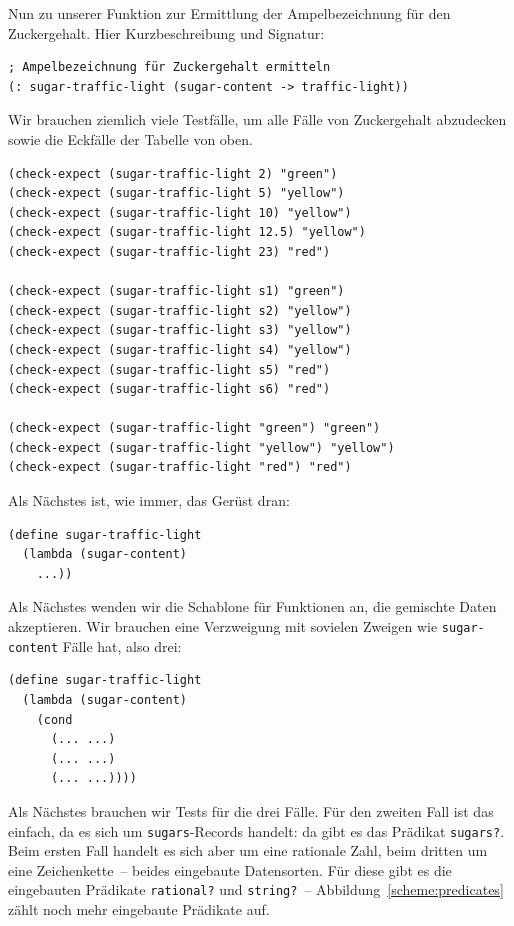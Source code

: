 Nun zu unserer Funktion zur Ermittlung der Ampelbezeichnung für den
Zuckergehalt.  Hier Kurzbeschreibung und Signatur:
%
\begin{lstlisting}
; Ampelbezeichnung für Zuckergehalt ermitteln
(: sugar-traffic-light (sugar-content -> traffic-light))
\end{lstlisting}
%
Wir brauchen ziemlich viele Testfälle, um alle Fälle von
Zuckergehalt abzudecken sowie die Eckfälle der Tabelle von oben.
%
\begin{lstlisting}
(check-expect (sugar-traffic-light 2) "green")
(check-expect (sugar-traffic-light 5) "yellow")
(check-expect (sugar-traffic-light 10) "yellow")
(check-expect (sugar-traffic-light 12.5) "yellow")
(check-expect (sugar-traffic-light 23) "red")

(check-expect (sugar-traffic-light s1) "green")
(check-expect (sugar-traffic-light s2) "yellow")
(check-expect (sugar-traffic-light s3) "yellow")
(check-expect (sugar-traffic-light s4) "yellow")
(check-expect (sugar-traffic-light s5) "red")
(check-expect (sugar-traffic-light s6) "red")

(check-expect (sugar-traffic-light "green") "green")
(check-expect (sugar-traffic-light "yellow") "yellow")
(check-expect (sugar-traffic-light "red") "red")
\end{lstlisting}
%
Als Nächstes ist, wie immer, das Gerüst dran:
%
\begin{lstlisting}
(define sugar-traffic-light
  (lambda (sugar-content)
    ...))
\end{lstlisting}         
%
Als Nächstes wenden wir die Schablone für Funktionen an, die gemischte
Daten akzeptieren.  Wir brauchen eine Verzweigung mit sovielen Zweigen
wie \lstinline{sugar-content} Fälle hat, also drei:
%
\begin{lstlisting}
(define sugar-traffic-light
  (lambda (sugar-content)
    (cond
      (... ...)
      (... ...)
      (... ...))))
\end{lstlisting}         
%
Als Nächstes brauchen wir Tests für die drei Fälle.  Für den zweiten
Fall ist das einfach, da es sich um \lstinline{sugars}-Records handelt:
da gibt es das Prädikat \lstinline{sugars?}.  Beim ersten Fall handelt es
sich aber um eine rationale Zahl, beim dritten um eine Zeichenkette~--
beides eingebaute Datensorten.  Für diese gibt es die eingebauten
Prädikate \lstinline{rational?} und \lstinline{string?}~--
Abbildung~\ref{scheme:predicates} zählt noch mehr eingebaute
Prädikate auf.
%
